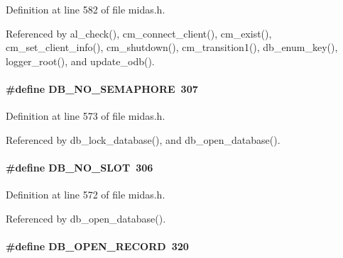 Definition at line 582 of file midas.h.

Referenced by al\_\-check(), cm\_\-connect\_\-client(), cm\_\-exist(), cm\_\-set\_\-client\_\-info(), cm\_\-shutdown(), cm\_\-transition1(), db\_\-enum\_\-key(), logger\_\-root(), and update\_\-odb().
\paragraph[{DB\_\-NO\_\-SEMAPHORE}]{\setlength{\rightskip}{0pt plus 5cm}\#define DB\_\-NO\_\-SEMAPHORE~307}\hfill\label{group__err23_ga1e4b50982e450b4c6a86a20e9120efbd}

\begin{DoxyItemize}
\item 
\end{DoxyItemize}

Definition at line 573 of file midas.h.

Referenced by db\_\-lock\_\-database(), and db\_\-open\_\-database().
\paragraph[{DB\_\-NO\_\-SLOT}]{\setlength{\rightskip}{0pt plus 5cm}\#define DB\_\-NO\_\-SLOT~306}\hfill\label{group__err23_gafbb1117afac5c259b09143378b454dcb}

\begin{DoxyItemize}
\item 
\end{DoxyItemize}

Definition at line 572 of file midas.h.

Referenced by db\_\-open\_\-database().
\paragraph[{DB\_\-OPEN\_\-RECORD}]{\setlength{\rightskip}{0pt plus 5cm}\#define DB\_\-OPEN\_\-RECORD~320}\hfill\label{group__err23_gacfc6bca00bde3af90d259cb4ae98deb0}

\begin{DoxyItemize}
\item 
\end{DoxyItemize}

